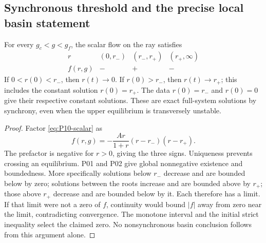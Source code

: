\subsection{Synchronous threshold and the precise local basin statement}
\label{slot:P10-4}

\begin{proposition}
\label{prop:P10-ray}
For every $g_c<g<g_f$, the scalar flow on the ray satisfies
\[
 \begin{array}{c|ccc}
 r&(0,r_-)&(r_-,r_+)&(r_+,\infty)\\ \hline
 f(r,g)&-&+&-
 \end{array}
\]
If $0<r(0)<r_-$, then $r(t)\to0$. If $r(0)>r_-$, then
$r(t)\to r_+$; this includes the constant solution $r(0)=r_+$.
The data $r(0)=r_-$ and $r(0)=0$ give their respective constant
solutions. These are exact full-system solutions by synchrony,
even when the upper equilibrium is transversely unstable.
\end{proposition}
\begin{proof}
Factor \eqref{eq:P10-scalar} as
\begin{equation}
 f(r,g)=-\frac{Ar}{1+r}(r-r_-)(r-r_+).
 \label{eq:P10-ray-factor}
\end{equation}
The prefactor is negative for $r>0$, giving the three signs.
Uniqueness prevents crossing an equilibrium. P01 and P02 give global
nonnegative existence and boundedness. More specifically solutions
below $r_-$ decrease and are bounded below by zero; solutions between
the roots increase and are bounded above by $r_+$; those above $r_+$
decrease and are bounded below by it. Each therefore has a limit.
If that limit were not a zero of $f$, continuity would bound $|f|$
away from zero near the limit, contradicting convergence. The monotone
interval and the initial strict inequality select the claimed zero.
No nonsynchronous basin conclusion follows from this argument alone.
\end{proof}

